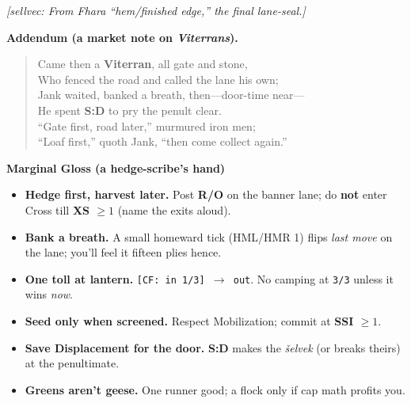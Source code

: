 \documentclass[11pt]{article}
\begin{document}
\noindent\textit{\small [\emph{sellvec:} From  Fhara “hem/finished edge,” the final lane-seal.]}

\medskip
\noindent\textbf{Addendum (a market note on \textit{Viterrans}).}
\begin{verse}
Came then a \textbf{Viterran}, all gate and stone,\\
Who fenced the road and called the lane his own;\\
Jank waited, banked a breath, then—door-time near—\\
He spent \textbf{S:D} to pry the penult clear.\\
“Gate first, road later,” murmured iron men;\\
“Loaf first,” quoth Jank, “then come collect again.”
\end{verse}

\medskip
\noindent\textbf{Marginal Gloss (a hedge-scribe’s hand)}
\begin{itemize}\setlength{\itemsep}{0.15em}
  \item \textbf{Hedge first, harvest later.} Post \textbf{R/O} on the banner lane; do \textbf{not} enter Cross till \textbf{XS $\ge 1$} (name the exits aloud).
  \item \textbf{Bank a breath.} A small homeward tick (\textsc{HML/HMR 1}) flips \emph{last move} on the lane; you’ll feel it fifteen plies hence.
  \item \textbf{One toll at lantern.} \texttt{[CF: in 1/3] $\rightarrow$ out}. No camping at \texttt{3/3} unless it wins \emph{now}.
  \item \textbf{Seed only when screened.} Respect Mobilization; commit at \textbf{SSI $\ge 1$}.
  \item \textbf{Save Displacement for the door.} \textbf{S:D} makes the \emph{šelvek} (or breaks theirs) at the penultimate.
  \item \textbf{Greens aren’t geese.} One runner good; a flock only if cap math profits you.
\end{itemize}

\clearpage
\end{document}

